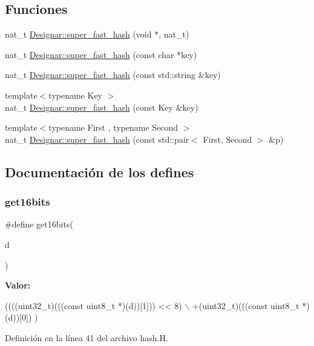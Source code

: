 \subsection*{Funciones}
\begin{DoxyCompactItemize}
\item 
nat\+\_\+t \hyperlink{namespace_designar_afd5712d16b3ae1c1c7d59f1004cd96fd}{Designar\+::super\+\_\+fast\+\_\+hash} (void $\ast$, nat\+\_\+t)
\item 
nat\+\_\+t \hyperlink{namespace_designar_a090aac15e358ba6f7db1b58d1fed363f}{Designar\+::super\+\_\+fast\+\_\+hash} (const char $\ast$key)
\item 
nat\+\_\+t \hyperlink{namespace_designar_a289dc254d6e2caad30367f337eb6a04e}{Designar\+::super\+\_\+fast\+\_\+hash} (const std\+::string \&key)
\item 
{\footnotesize template$<$typename Key $>$ }\\nat\+\_\+t \hyperlink{namespace_designar_a1996522f2f70bdf5dc5659a5a0e42c86}{Designar\+::super\+\_\+fast\+\_\+hash} (const Key \&key)
\item 
{\footnotesize template$<$typename First , typename Second $>$ }\\nat\+\_\+t \hyperlink{namespace_designar_af31e2906f9449591dfe3b6380768ad44}{Designar\+::super\+\_\+fast\+\_\+hash} (const std\+::pair$<$ First, Second $>$ \&p)
\end{DoxyCompactItemize}


\subsection{Documentación de los \textquotesingle{}defines\textquotesingle{}}
\mbox{\label{hash_8_h_abc7d71657be8975a51684e41029b7964}} 
\subsubsection{\texorpdfstring{get16bits}{get16bits}}
{\footnotesize\ttfamily \#define get16bits(\begin{DoxyParamCaption}\item[{}]{d }\end{DoxyParamCaption})}

{\bfseries Valor\+:}
\begin{DoxyCode}
((((uint32\_t)(((\textcolor{keyword}{const} uint8\_t *)(d))[1])) << 8) \(\backslash\)
              +(uint32\_t)(((\textcolor{keyword}{const} uint8\_t *)(d))[0]) )
\end{DoxyCode}


Definición en la línea 41 del archivo hash.\+H.

